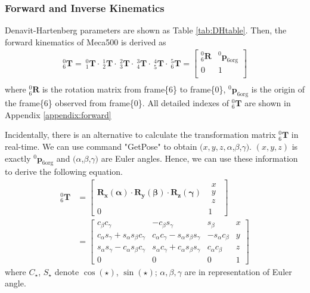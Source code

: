 \subsubsection{Forward and Inverse Kinematics}
\label{sec:forward}
\hspace*{6mm}Denavit-Hartenberg parameters are shown as Table \ref{tab:DHtable}. Then, the forward kinematics of Meca500 is derived as
\begin{equation}
\label{eq:translation matrix}
\begin{split}
^0_6\mathbf{T} =
\ ^0_1\mathbf{T} \cdot \ ^1_2\mathbf{T} \cdot \ ^2_3\mathbf{T} \cdot \ ^3_4\mathbf{T} \cdot \ ^4_5\mathbf{T} \cdot \ ^5_6\mathbf{T} =
\begin{bmatrix}
^0_6\mathbf{R}	&^0\boldsymbol{p}_\mathrm{6org}\\
0				&1\\
\end{bmatrix}\\
\end{split}
\end{equation}
where $^0_6\mathbf{R}$ is the rotation matrix from frame\{6\} to frame\{0\}, $^0\boldsymbol{p}_\mathrm{6org}$ is the origin of the frame\{6\} observed from frame\{0\}. All detailed indexes of $^0_6\mathbf{T}$ are shown in Appendix \ref{appendix:forward}
\par
Incidentally, there is an alternative to calculate the transformation matrix $^0_6\mathbf{T} $ in real-time. We can use command "GetPose" to obtain $(x,y,z,\alpha$,$\beta$,$\gamma)$. $(x,y,z)$ is exactly $^0\boldsymbol{p}_\mathrm{6org}$ and $(\alpha$,$\beta$,$\gamma)$ are Euler angles.  Hence, we can use these information to derive the following equation.
\begin{equation}
\begin{split}
^0_6\mathbf{T} 
&= 
\begin{bmatrix}
\mathbf{R_x(\alpha ) \cdot R_y(\beta ) \cdot R_z(\gamma )} 
& \begin{matrix}
x\\ 
y\\ 
z
\end{matrix}\\ 
0 & 1
\end{bmatrix}\\
&= 
\begin{bmatrix} 
c_\beta c_\gamma 										& -c_\beta s_\gamma 									& s_\beta 					&x\\ 
c_\alpha s_\gamma +  s_\alpha s_\beta c_\gamma 			& c_\alpha c_\gamma -  s_\alpha s_\beta s_\gamma		& -s_\alpha c_\beta			&y\\ 
s_\alpha s_\gamma -  c_\alpha s_\beta c_\gamma 			& s_\alpha c_\gamma +  c_\alpha s_\beta s_\gamma 		& c_\alpha c_\beta 			&z\\ 
0 														&0 														&0							&1
\end{bmatrix}
\end{split}
\end{equation}
where $C_{\star} $, $ S_{\star}$ denote $\cos \left(\star \right)$, $\sin \left(\star \right)$; $\alpha ,\beta ,\gamma$ are in representation of Euler angle.
